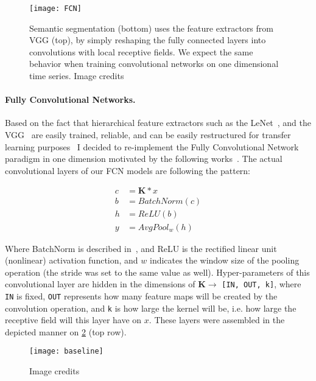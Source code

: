 \begin{figure}
  \centering
  \texttt{[image: FCN]}\label{fig:FCN}
  \caption{Semantic segmentation (bottom) uses the feature extractors from VGG (top), by simply reshaping the fully connected layers into convolutions with local receptive fields. We expect the same behavior when training convolutional networks on one dimensional time series. Image credits~\cite{Long_2015_CVPR}}
\end{figure}

\paragraph{Fully Convolutional Networks.}
Based on the fact that hierarchical feature extractors such as the LeNet~\cite{lecun1995convolutional}, and the VGG~\cite{VGG} are easily trained, reliable, and can be easily restructured for transfer learning purposes~\cite{transfer learning} I decided to re-implement the Fully Convolutional Network~\cite{Long_2015_CVPR} paradigm in one dimension motivated by the following works~\cite{mittelman2015time, langkvist2014review}.
The actual convolutional layers of our FCN models are following the pattern:
\begin{center}
  \begin{equation}\label{eq:conv}
    \begin{split}
      c &= \mathbf{K} \ast x\\
      b &= BatchNorm(c)\\
      h &= ReLU(b)\\
      y &= AvgPool_w(h)
    \end{split}
  \end{equation}
\end{center}

Where BatchNorm is described in~\cite{batchnorm}, and ReLU is the rectified linear unit (nonlinear) activation function, and $w$ indicates the window size of the pooling operation (the stride was set to the same value as well).
Hyper-parameters of this convolutional layer are hidden in the dimensions of  $\mathbf{K}\rightarrow$ \texttt{[IN, OUT, k]}, where \texttt{IN} is fixed, \texttt{OUT} represents how many feature maps will be created by the convolution operation, and \texttt{k} is how large the kernel will be, i.e. how large the receptive field will this layer have on $x$.
These layers were assembled in the depicted manner on \ref{fig:baseline} (top row).

\begin{figure}
  \centering
  \texttt{[image: baseline]}\label{fig:baseline}
  \caption{Image credits~\cite{wang2016time}}
\end{figure}

